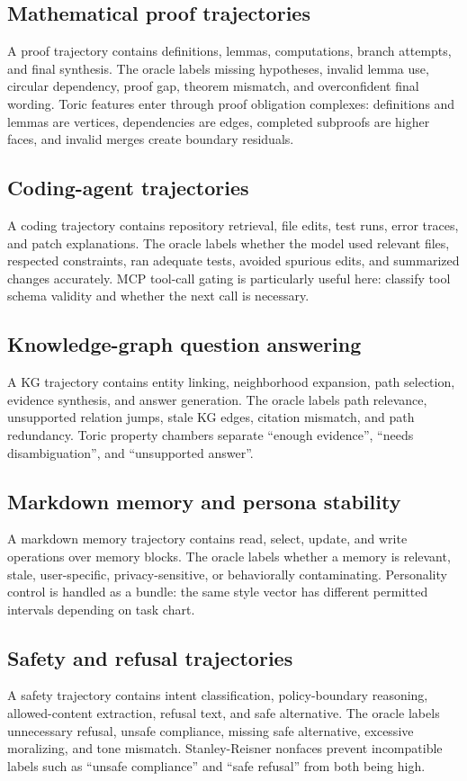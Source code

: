 \documentclass[11pt]{article}
\numberwithin{equation}{section}
\begin{document}
\subsection{Mathematical proof trajectories}
A proof trajectory contains definitions, lemmas, computations, branch attempts, and final synthesis. The oracle labels missing hypotheses, invalid lemma use, circular dependency, proof gap, theorem mismatch, and overconfident final wording. Toric features enter through proof obligation complexes: definitions and lemmas are vertices, dependencies are edges, completed subproofs are higher faces, and invalid merges create boundary residuals.

\subsection{Coding-agent trajectories}
A coding trajectory contains repository retrieval, file edits, test runs, error traces, and patch explanations. The oracle labels whether the model used relevant files, respected constraints, ran adequate tests, avoided spurious edits, and summarized changes accurately. MCP tool-call gating is particularly useful here: classify tool schema validity and whether the next call is necessary.

\subsection{Knowledge-graph question answering}
A KG trajectory contains entity linking, neighborhood expansion, path selection, evidence synthesis, and answer generation. The oracle labels path relevance, unsupported relation jumps, stale KG edges, citation mismatch, and path redundancy. Toric property chambers separate ``enough evidence'', ``needs disambiguation'', and ``unsupported answer''.

\subsection{Markdown memory and persona stability}
A markdown memory trajectory contains read, select, update, and write operations over memory blocks. The oracle labels whether a memory is relevant, stale, user-specific, privacy-sensitive, or behaviorally contaminating. Personality control is handled as a bundle: the same style vector has different permitted intervals depending on task chart.

\subsection{Safety and refusal trajectories}
A safety trajectory contains intent classification, policy-boundary reasoning, allowed-content extraction, refusal text, and safe alternative. The oracle labels unnecessary refusal, unsafe compliance, missing safe alternative, excessive moralizing, and tone mismatch. Stanley-Reisner nonfaces prevent incompatible labels such as ``unsafe compliance'' and ``safe refusal'' from both being high.
\end{document}
